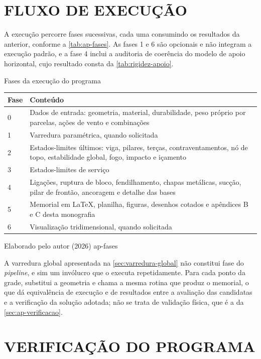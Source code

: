 \section{FLUXO DE EXECUÇÃO}\label{sec:ap-fluxo}

A execução percorre fases sucessivas, cada uma consumindo os resultados da
anterior, conforme a \autoref{tab:ap-fases}. As fases 1 e 6 são opcionais e não
integram a execução padrão, e a fase 4 inclui a auditoria de coerência do modelo
de apoio horizontal, cujo resultado consta da \autoref{tab:rigidez-apoio}.

\tabela
{Fases da execução do programa}
{\footnotesize
\begin{tabular}{lp{8.4cm}}
\toprule
    \textbf{Fase} & \textbf{Conteúdo} \\
\midrule
    0 & Dados de entrada: geometria, material, durabilidade, peso próprio por parcelas, ações de vento e combinações \\
    1 & Varredura paramétrica, quando solicitada \\
    2 & Estados-limites últimos: viga, pilares, terças, contraventamentos, nó de topo, estabilidade global, fogo, impacto e içamento \\
    3 & Estados-limites de serviço \\
    4 & Ligações, ruptura de bloco, fendilhamento, chapas metálicas, sucção, pilar de frontão, ancoragem e detalhe das bases \\
    5 & Memorial em LaTeX, planilha, figuras, desenhos cotados e apêndices B e C desta monografia \\
    6 & Visualização tridimensional, quando solicitada \\
\bottomrule
\end{tabular}}
{Elaborado pelo autor (2026)}
{ap-fases}
{}
{}

A varredura global apresentada na \autoref{sec:varredura-global} não constitui
fase do \textit{pipeline}, e sim um invólucro que o executa repetidamente. Para cada
ponto da grade, substitui a geometria e chama a mesma rotina que produz o
memorial, o que dá equivalência de execução e de resultados entre a avaliação
das candidatas e a verificação da solução adotada; não se trata de validação
física, que é a da \autoref{sec:ap-verificacao}.

\section{VERIFICAÇÃO DO PROGRAMA}\label{sec:ap-verificacao}

